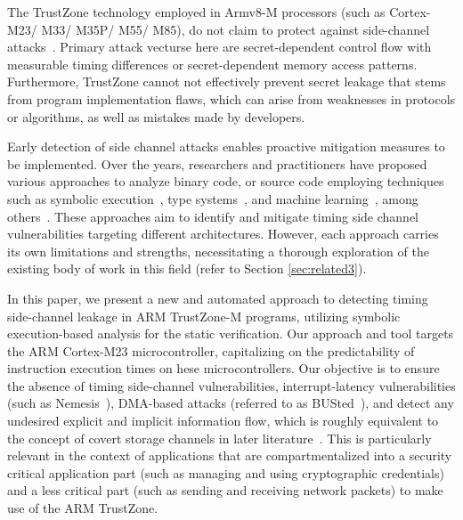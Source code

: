 The TrustZone technology employed in Armv8-M processors (such as
Cortex-M23/ M33/ M35P/ M55/ M85), do not claim to protect against
side-channel attacks~\cite{armdeveloper}. Primary attack vecturse here are
secret-dependent control flow with measurable timing differences or
secret-dependent memory access patterns.  Furthermore, TrustZone cannot not
effectively prevent secret leakage that stems from program implementation
flaws, which can arise from weaknesses in protocols or algorithms, as well
as mistakes made by developers.
%


Early detection of side channel attacks enables proactive mitigation
measures to be implemented. Over the years, researchers and practitioners
have proposed various approaches to analyze binary code, or source code
employing techniques such as symbolic execution~\cite{binsec, pitchfork},
type systems~\cite{scfmsp, MantelAVR, Agat, barthe2014system}, and machine
learning~\cite{MLforSC}, among others~\cite{timingattack}. These approaches
aim to identify and mitigate timing side channel vulnerabilities targeting
different architectures. However, each approach carries its own limitations
and strengths, necessitating a thorough exploration of the existing body of
work in this field (refer to Section \ref{sec:related3}).

In this paper, we present a new and automated approach to detecting timing
side-channel leakage in ARM TrustZone-M programs, utilizing symbolic
execution-based analysis for the static verification. Our approach and tool
targets the ARM Cortex-M23 microcontroller, capitalizing on the
predictability of instruction execution times on hese microcontrollers.
Our objective is to ensure the absence of timing side-channel
vulnerabilities, interrupt-latency vulnerabilities (such as
Nemesis~\cite{Nemesis}), DMA-based attacks (referred to as
BUSted~\cite{busted}), and detect any undesired explicit and implicit
information flow, which is roughly equivalent to the concept of covert
storage channels in later literature~\cite{storagechannel}. This is
particularly relevant in the context of applications that are
compartmentalized into a security critical application part (such as
managing and using cryptographic credentials) and a less critical part
(such as sending and receiving network packets) to make use of the ARM
TrustZone. 

